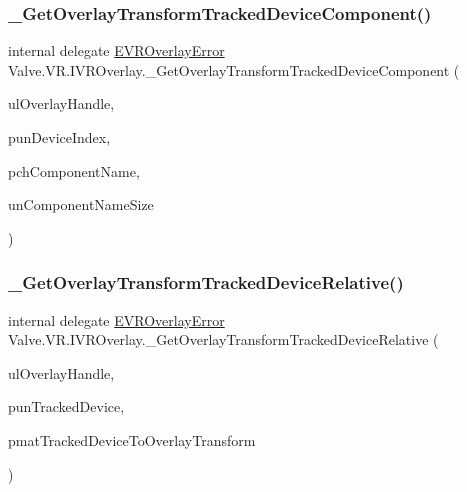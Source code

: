 \subsubsection{\texorpdfstring{\_GetOverlayTransformTrackedDeviceComponent()}{\_GetOverlayTransformTrackedDeviceComponent()}}
{\footnotesize\ttfamily internal delegate \mbox{\hyperlink{namespace_valve_1_1_v_r_aaee5c5144f42b7969d45b854f51b0c18}{E\+V\+R\+Overlay\+Error}} Valve.\+V\+R.\+I\+V\+R\+Overlay.\+\_\+\+Get\+Overlay\+Transform\+Tracked\+Device\+Component (\begin{DoxyParamCaption}\item[{ulong}]{ul\+Overlay\+Handle,  }\item[{ref uint}]{pun\+Device\+Index,  }\item[{System.\+Text.\+String\+Builder}]{pch\+Component\+Name,  }\item[{uint}]{un\+Component\+Name\+Size }\end{DoxyParamCaption})}

\mbox{\label{struct_valve_1_1_v_r_1_1_i_v_r_overlay_aab0d31c4d5c91a030e4625b2f355f126}} 
\subsubsection{\texorpdfstring{\_GetOverlayTransformTrackedDeviceRelative()}{\_GetOverlayTransformTrackedDeviceRelative()}}
{\footnotesize\ttfamily internal delegate \mbox{\hyperlink{namespace_valve_1_1_v_r_aaee5c5144f42b7969d45b854f51b0c18}{E\+V\+R\+Overlay\+Error}} Valve.\+V\+R.\+I\+V\+R\+Overlay.\+\_\+\+Get\+Overlay\+Transform\+Tracked\+Device\+Relative (\begin{DoxyParamCaption}\item[{ulong}]{ul\+Overlay\+Handle,  }\item[{ref uint}]{pun\+Tracked\+Device,  }\item[{ref \mbox{\hyperlink{struct_valve_1_1_v_r_1_1_hmd_matrix34__t}{Hmd\+Matrix34\+\_\+t}}}]{pmat\+Tracked\+Device\+To\+Overlay\+Transform }\end{DoxyParamCaption})}

\mbox{\label{struct_valve_1_1_v_r_1_1_i_v_r_overlay_a99fe5b9dbb9381067659cb1c5e5a1cd9}} 

